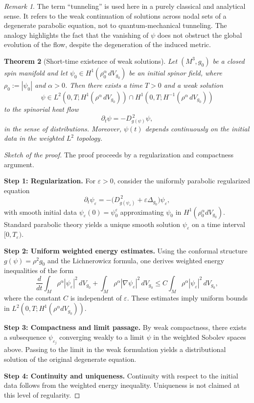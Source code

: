 \documentclass[11pt, reqno, a4paper]{amsart}
\newtheorem{theorem}{Theorem}[section]
\theoremstyle{definition}
\theoremstyle{remark}
\newtheorem{remark}[theorem]{Remark}
\begin{document}
\begin{remark}
    The term ``tunneling'' is used here in a purely classical and analytical sense. It refers to the weak continuation of solutions across nodal sets of a degenerate parabolic equation, not to quantum-mechanical tunneling.
The analogy highlights the fact that the vanishing of $\psi$ does not obstruct the global evolution of the flow, despite the degeneration of the induced metric.
\end{remark}

\begin{theorem}[Short-time existence of weak solutions]
Let $(M^3,g_0)$ be a closed spin manifold and let
$\psi_0 \in H^1(\rho_0^\alpha\, dV_{g_0})$ be an initial spinor field,
where $\rho_0 := |\psi_0|$ and $\alpha>0$.
Then there exists a time $T>0$ and a weak solution
\[
\psi \in L^2(0,T; H^1(\rho^\alpha\, dV_{g_0})) \cap
H^1(0,T; H^{-1}(\rho^\alpha\, dV_{g_0}))
\]
to the spinorial heat flow
\[
\partial_t \psi = - D_{g(\psi)}^{\,2}\psi,
\]
in the sense of distributions.
Moreover, $\psi(t)$ depends continuously on the initial data in the
weighted $L^2$ topology.
\end{theorem}

\begin{proof}[Sketch of the proof]
The proof proceeds by a regularization and compactness argument.

\medskip
\noindent
\textbf{Step 1: Regularization.}
For $\varepsilon>0$, consider the uniformly parabolic regularized equation
\[
\partial_t \psi_\varepsilon
= -\big(D_{g(\psi_\varepsilon)}^{\,2} + \varepsilon \Delta_{g_0}\big)\psi_\varepsilon,
\]
with smooth initial data $\psi_{\varepsilon}(0)=\psi_0^\varepsilon$
approximating $\psi_0$ in $H^1(\rho_0^\alpha dV_{g_0})$.
Standard parabolic theory yields a unique smooth solution
$\psi_\varepsilon$ on a time interval $[0,T_\varepsilon)$.

\medskip
\noindent
\textbf{Step 2: Uniform weighted energy estimates.}
Using the conformal structure $g(\psi)=\rho^2 g_0$ and the Lichnerowicz formula,
one derives weighted energy inequalities of the form
\[
\frac{d}{dt}\int_M \rho^\alpha |\psi_\varepsilon|^2\, dV_{g_0}
+ \int_M \rho^\alpha |\nabla \psi_\varepsilon|^2\, dV_{g_0}
\le C \int_M \rho^\alpha |\psi_\varepsilon|^2\, dV_{g_0},
\]
where the constant $C$ is independent of $\varepsilon$.
These estimates imply uniform bounds in
$L^2(0,T; H^1(\rho^\alpha dV_{g_0}))$.

\medskip
\noindent
\textbf{Step 3: Compactness and limit passage.}
By weak compactness, there exists a subsequence $\psi_{\varepsilon_j}$
converging weakly to a limit $\psi$ in the weighted Sobolev spaces above.
Passing to the limit in the weak formulation yields a distributional
solution of the original degenerate equation.

\medskip
\noindent
\textbf{Step 4: Continuity and uniqueness.}
Continuity with respect to the initial data follows from the weighted
energy inequality.
Uniqueness is not claimed at this level of regularity.
\end{proof}
\end{document}
